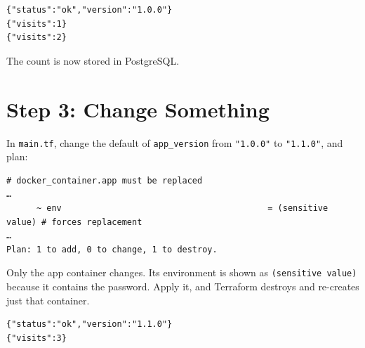 \begin{codeblock}
\begin{Verbatim}[formatcom=\outputstyle]
{"status":"ok","version":"1.0.0"}
{"visits":1}
{"visits":2}
\end{Verbatim}
\end{codeblock}

The count is now stored in PostgreSQL.


\section{Step 3: Change Something}\label{11-lab-rebuild-everything-from-code:step-3-change-something}

In \texttt{main.tf}, change the default of \texttt{app\_version} from \texttt{"1.0.0"} to \texttt{"1.1.0"}, and plan:

\begin{codeblock}
\begin{Verbatim}[formatcom=\outputstyle]
  # docker_container.app must be replaced
…
      ~ env                                         = (sensitive value) # forces replacement
…
Plan: 1 to add, 0 to change, 1 to destroy.
\end{Verbatim}
\end{codeblock}

Only the app container changes. Its environment is shown as \texttt{(sensitive\ value)} because it contains the password. Apply it, and Terraform destroys and re-creates just that container.

\begin{codeblock}

\begin{Shaded}
\begin{Highlighting}[]
\end{Highlighting}
\end{Shaded}

\end{codeblock}

\begin{codeblock}
\begin{Verbatim}[formatcom=\outputstyle]
{"status":"ok","version":"1.1.0"}
{"visits":3}
\end{Verbatim}
\end{codeblock}

